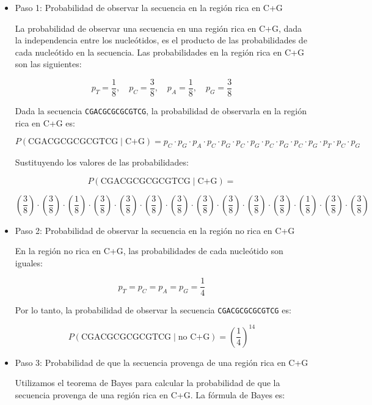 \begin{itemize}
\item Paso 1: Probabilidad de observar la secuencia en la región rica en C+G

La probabilidad de observar una secuencia en una región rica en C+G, dada la independencia entre los nucleótidos, es el producto de las probabilidades de cada nucleótido en la secuencia. Las probabilidades en la región rica en C+G son las siguientes:

\[
p_T = \frac{1}{8}, \quad p_C = \frac{3}{8}, \quad p_A = \frac{1}{8}, \quad p_G = \frac{3}{8}
\]

Dada la secuencia \texttt{CGACGCGCGCGTCG}, la probabilidad de observarla en la región rica en C+G es:

\[
P(\text{CGACGCGCGCGTCG} \mid \text{C+G}) = p_C \cdot p_G \cdot p_A \cdot p_C \cdot p_G \cdot p_C \cdot p_G \cdot p_C \cdot p_G \cdot p_C \cdot p_G \cdot p_T \cdot p_C \cdot p_G
\]

Sustituyendo los valores de las probabilidades:

\small
\[
P(\text{CGACGCGCGCGTCG} \mid \text{C+G}) = 
\]

\[
\left( \frac{3}{8} \right) \cdot \left( \frac{3}{8} \right) \cdot \left( \frac{1}{8} \right) \cdot \left( \frac{3}{8} \right) \cdot \left( \frac{3}{8} \right) \cdot \left( \frac{3}{8} \right) \cdot \left( \frac{3}{8} \right) \cdot \left( \frac{3}{8} \right) \cdot \left( \frac{3}{8} \right) \cdot \left( \frac{3}{8} \right) \cdot \left( \frac{3}{8} \right) \cdot \left( \frac{1}{8} \right) \cdot \left( \frac{3}{8} \right) \cdot \left( \frac{3}{8} \right)
\]

\normalsize

\item Paso 2: Probabilidad de observar la secuencia en la región no rica en C+G

En la región no rica en C+G, las probabilidades de cada nucleótido son iguales:

\[
p_T = p_C = p_A = p_G = \frac{1}{4}
\]

Por lo tanto, la probabilidad de observar la secuencia \texttt{CGACGCGCGCGTCG} es:

\[
P(\text{CGACGCGCGCGTCG} \mid \text{no C+G}) = \left( \frac{1}{4} \right)^{14}
\]

\item Paso 3: Probabilidad de que la secuencia provenga de una región rica en C+G

Utilizamos el teorema de Bayes para calcular la probabilidad de que la secuencia provenga de una región rica en C+G. La fórmula de Bayes es:


\end{itemize}
